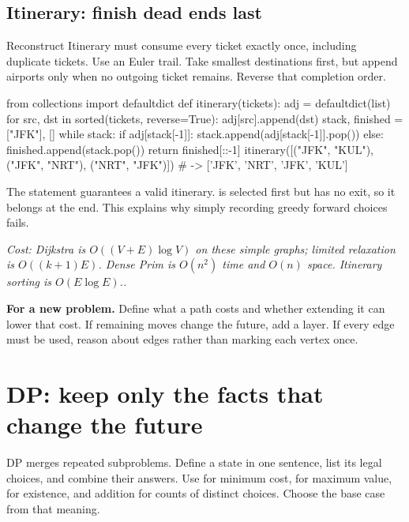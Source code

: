 \documentclass[11pt]{article}
\newcommand{\cd}[1]{{\frenchspacing\texttt{\detokenize{#1}}}}
\newcommand{\transfer}[1]{\par\textbf{For a new problem.} #1\par}
\newcommand{\cost}[1]{\par\textit{Cost: #1.}\par}
\begin{document}
\subsection{Itinerary: finish dead ends last}
Reconstruct Itinerary must consume every ticket exactly once, including duplicate tickets.
Use an Euler trail. Take smallest destinations first, but append airports only when no outgoing ticket remains.
Reverse that completion order.
\par\noindent\begin{minipage}{\linewidth}
\hypertarget{example-start-47}{}
\begin{pyex}
from collections import defaultdict
def itinerary(tickets):
    adj = defaultdict(list)
    for src, dst in sorted(tickets, reverse=True):
        adj[src].append(dst)
    stack, finished = ["JFK"], []
    while stack:
        if adj[stack[-1]]:
            stack.append(adj[stack[-1]].pop())
        else:
            finished.append(stack.pop())
    return finished[::-1]
itinerary([("JFK", "KUL"), ("JFK", "NRT"), ("NRT", "JFK")])
# -> ['JFK', 'NRT', 'JFK', 'KUL']
\end{pyex}
\hypertarget{example-end-47}{}
\end{minipage}\par
The statement guarantees a valid itinerary. \cd{KUL} is selected first but has no exit, so it belongs at the end.
This explains why simply recording greedy forward choices fails.
\cost{Dijkstra is \(O((V+E)\log V)\) on these simple graphs; limited relaxation is \(O((k+1)E)\).
Dense Prim is \(O(n^2)\) time and \(O(n)\) space. Itinerary sorting is \(O(E\log E)\).}
\transfer{Define what a path costs and whether extending it can lower that cost.
If remaining moves change the future, add a layer. If every edge must be used, reason about edges rather than marking each vertex once.}

\section{DP: keep only the facts that change the future}\label{sec:dp}
DP merges repeated subproblems. Define a state in one sentence, list its legal choices, and combine their answers.
Use \cd{min} for minimum cost, \cd{max} for maximum value, \cd{or} for existence, and addition for counts of distinct choices.
Choose the base case from that meaning.
\end{document}
